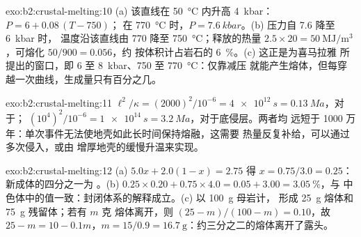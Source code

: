 \begin{solution}{exo:b2:crustal-melting:10}
(a) 该直线在 \qty{50}{\celsius} 内升高 \qty{4}{kbar}：$P = 6 + 0.08\,(T - 750)$；
在 \qty{770}{\celsius} 时，$P = \qty{7.6}{kbar}$。(b) 压力自 7.6 降至 \qty{6}{kbar} 时，
温度沿该直线由 770 降至 \qty{750}{\celsius}；释放的热量
$2.5\times20 = \qty{50}{\mega\joule\per\cubic\metre}$，可熔化 $50/900 = 0.056$，约
按体积计占岩石的 \qty{6}{\percent}。(c) 这正是为喜马拉雅
所提出的窗口，即 6 至 \qty{8}{kbar}、750 至 \qty{770}{\celsius}：仅靠减压
就能产生熔体，但每穿越一次曲线，生成量只有百分之几。
\end{solution}

\begin{solution}{exo:b2:crustal-melting:11}
$\ell^2/\kappa = (2000)^2/10^{-6} = \qty{4e12}{s} = \qty{0.13}{Ma}$，对于；
$(10^4)^2/10^{-6} = \qty{1e14}{s} = \qty{3.2}{Ma}$，对于底侵层。两者均
远短于 1000 万年：单次事件无法使地壳如此长时间保持熔融，这需要
热量反复补给，可以通过多次侵入，或由
增厚地壳的缓慢升温来实现。
\end{solution}

\begin{solution}{exo:b2:crustal-melting:12}
(a) $5.0x + 2.0(1 - x) = 2.75$ 得 $x = 0.75/3.0 = 0.25$：新成体的四分之一为
。(b) $0.25\times0.20 + 0.75\times4.0 = 0.05 + 3.00 = \qty{3.05}{\percent}$，与
中色体中的值一致：封闭体系的解释成立。(c) 以 \qty{100}{\gram} 母岩计，
形成 \qty{25}{\gram} 熔体和 \qty{75}{\gram} 残留体；若有 $m$ 克
熔体离开，则 $(25 - m)/(100 - m) = 0.10$，故 $25 - m = 10 - 0.1m$，$m = 15/0.9 =
\qty{16.7}{\gram}$：约三分之二的熔体离开了露头。
\end{solution}

